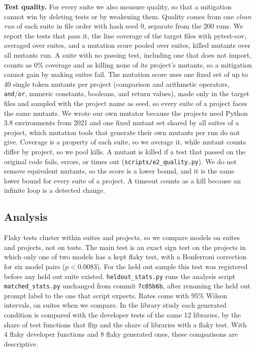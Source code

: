 \textbf{Test quality.} For every suite we also measure quality, so that a mitigation cannot win by deleting tests or by weakening them. Quality comes from one \emph{clean run} of each suite in file order with hash seed 0, separate from the 200 runs. We report the tests that pass it, the line coverage of the target files with pytest-cov, averaged over suites, and a mutation score pooled over suites, killed mutants over all mutants run. A suite with no passing test, including one that does not import, counts as 0\% coverage and as killing none of its project's mutants, so a mitigation cannot gain by making suites fail. The mutation score uses one fixed set of up to 40 single token mutants per project (comparison and arithmetic operators, \texttt{and}/\texttt{or}, numeric constants, booleans, and return values), made only in the target files and sampled with the project name as seed, so every suite of a project faces the same mutants. We wrote our own mutator because the projects need Python 3.8 environments from 2021 and one fixed mutant set shared by all suites of a project, which mutation tools that generate their own mutants per run do not give. Coverage is a property of each suite, so we average it, while mutant counts differ by project, so we pool kills. A mutant is killed if a test that passed on the original code fails, errors, or times out (\texttt{scripts/e2\_quality.py}). We do not remove equivalent mutants, so the score is a lower bound, and it is the same lower bound for every suite of a project. A timeout counts as a kill because an infinite loop is a detected change.

\subsection{Analysis}
Flaky tests cluster within suites and projects, so we compare models on suites and projects, not on tests. The main test is an exact sign test on the projects in which only one of two models has a kept flaky test, with a Bonferroni correction for six model pairs ($p < 0.0083$). For the held out sample this test was registered before any held out suite existed. \texttt{heldout\_stats.py} runs the analysis script \texttt{matched\_stats.py} unchanged from commit \texttt{7c05b6b}, after renaming the held out prompt label to the one that script expects. Rates come with 95\% Wilson intervals, on suites when we compare. In the library study each generated condition is compared with the developer tests of the same 12 libraries, by the share of test functions that flip and the share of libraries with a flaky test. With 4 flaky developer functions and 8 flaky generated ones, these comparisons are descriptive.
